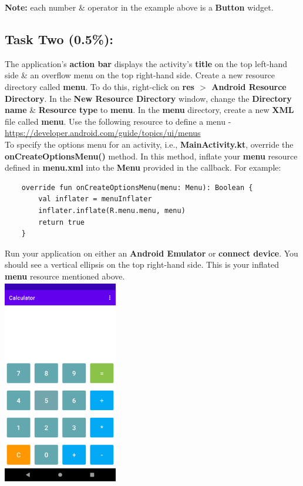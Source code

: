 \documentclass{article}
\begin{document}
\textbf{Note:} each number \& operator in the example above is a \textbf{Button} widget.

\subsection*{Task Two (0.5\%):} 
The application's \textbf{action bar} displays the activity's \textbf{title} on the top left-hand side \& an overflow menu on the top right-hand side. Create a new resource directory called \textbf{menu}. To do this, right-click on \textbf{res $>$ Android Resource Directory}. In the \textbf{New Resource Directory} window, change the \textbf{Directory name} \& \textbf{Resource type} to \textbf{menu}. In the \textbf{menu} directory, create a new \textbf{XML} file called \textbf{menu}. Use the following resource to define a menu - \href{https://developer.android.com/guide/topics/ui/menus}{https://developer.android.com/guide/topics/ui/menus} \\

To specify the options menu for an activity, i.e., \textbf{MainActivity.kt}, override the \textbf{onCreateOptionsMenu()} method. In this method, inflate your \textbf{menu} resource defined in \textbf{menu.xml} into the \textbf{Menu} provided in the callback. For example:

\begin{verbatim}
    override fun onCreateOptionsMenu(menu: Menu): Boolean {
        val inflater = menuInflater
        inflater.inflate(R.menu.menu, menu)
        return true
    }
\end{verbatim}

Run your application on either an \textbf{Android Emulator} or \textbf{connect device}. You should see a vertical ellipsis on the top right-hand side. This is your inflated \textbf{menu} resource mentioned above. \\

\includegraphics[width=5cm, height=9cm]{../../resources/img/practicals/02-calculator-2.png}
\end{document}
